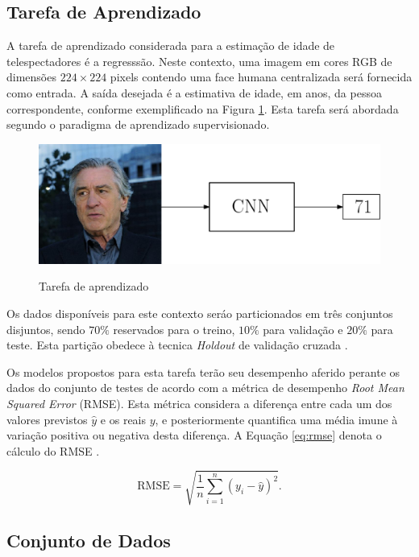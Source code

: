 
\subsection{Tarefa de Aprendizado}
A tarefa de aprendizado considerada para a estimação de idade de telespectadores é a regresssão. Neste contexto, uma imagem em cores RGB de dimensões $224 \times 224$ pixels contendo uma face humana centralizada será fornecida como entrada. A saída desejada é a estimativa de idade, em anos, da pessoa correspondente, conforme exemplificado na Figura \ref{fig:deniro_cnn}. Esta tarefa será abordada segundo o paradigma de aprendizado supervisionado.

\begin{figure}
  \centering
     \caption{Tarefa de aprendizado}
     \includegraphics[width=\textwidth]{img/deniro_cnn}
     \label{fig:deniro_cnn}
\end{figure}

Os dados disponíveis para este contexto seráo particionados em três conjuntos disjuntos, sendo $70\%$ reservados para o treino, $10\%$ para validação e $20\%$ para teste. Esta partição obedece à tecnica \emph{Holdout} de validação cruzada \cite{brink2016real}.

Os modelos propostos para esta tarefa terão seu desempenho aferido perante os dados do conjunto de testes de acordo com a métrica de desempenho \emph{Root Mean Squared Error} (RMSE). Esta métrica considera a diferença entre cada um dos valores previstos $\hat{y}$ e os reais $y$, e posteriormente quantifica uma média imune à variação positiva ou negativa desta diferença. A Equação \ref{eq:rmse} denota o cálculo do RMSE \cite{brink2016real}.

\begin{equation}\label{eq:rmse}
     \textrm{RMSE} = \sqrt{\frac{1}{n} \sum_{i=1}^n (y_i - \hat{y})^2}.
\end{equation}

\subsection{Conjunto de Dados}


